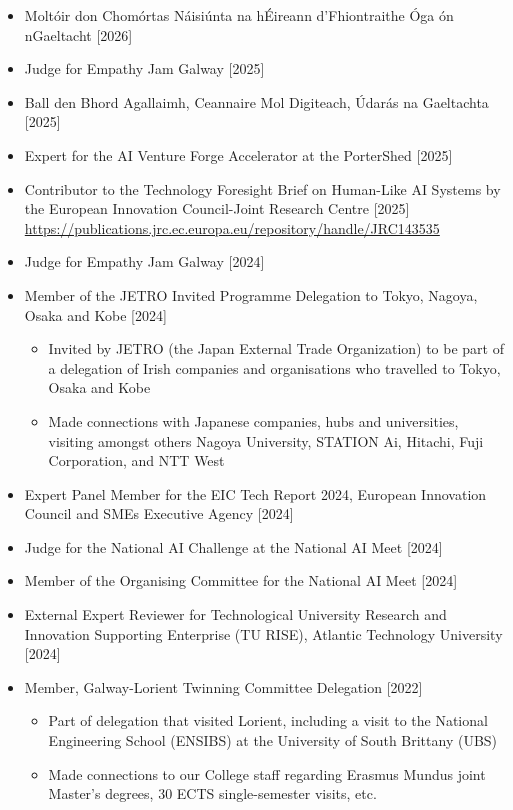 \documentclass[10pt,a4paper]{res} %
\begin{document}
\begin{resume}
\begin{itemize} \itemsep -2pt
\item Molt\'{o}ir don Chom\'{o}rtas N\'{a}isi\'{u}nta na h\'{E}ireann d'Fhiontraithe \'{O}ga \'{o}n nGaeltacht [2026]
\item Judge for Empathy Jam Galway [2025]
\item Ball den Bhord Agallaimh, Ceannaire Mol Digiteach, \'{U}dar\'{a}s na Gaeltachta [2025]
\item Expert for the AI Venture Forge Accelerator at the PorterShed [2025]
\item Contributor to the Technology Foresight Brief on Human-Like AI Systems by the European Innovation Council-Joint Research Centre [2025] \url{https://publications.jrc.ec.europa.eu/repository/handle/JRC143535}
\item Judge for Empathy Jam Galway [2024]
\item Member of the JETRO Invited Programme Delegation to Tokyo, Nagoya, Osaka and Kobe [2024]
\begin{itemize} \itemsep -2pt
\item Invited by JETRO (the Japan External Trade Organization) to be part of a delegation of Irish companies and organisations who travelled to Tokyo, Osaka and Kobe
\item Made connections with Japanese companies, hubs and universities, visiting amongst others Nagoya University, STATION Ai, Hitachi, Fuji Corporation, and NTT West
\end{itemize}
\item Expert Panel Member for the EIC Tech Report 2024, European Innovation Council and SMEs Executive Agency [2024]
\item Judge for the National AI Challenge at the National AI Meet [2024]
\item Member of the Organising Committee for the National AI Meet [2024]
\item External Expert Reviewer for Technological University Research and Innovation Supporting Enterprise (TU RISE), Atlantic Technology University [2024]
\item Member, Galway-Lorient Twinning Committee Delegation [2022]
\begin{itemize} \itemsep -2pt
\item Part of delegation that visited Lorient, including a visit to the National Engineering School (ENSIBS) at the University of South Brittany (UBS)
\item Made connections to our College staff regarding Erasmus Mundus joint Master’s degrees, 30 ECTS single-semester visits, etc.

\end{itemize}
\end{itemize}
\end{resume}
\end{document}
